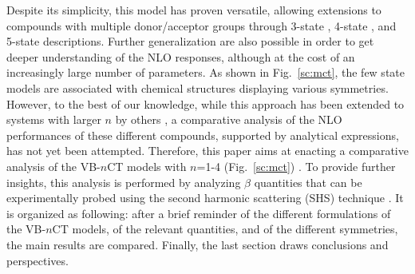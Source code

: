 \documentclass[USenglish]{article}
\begin{document}
Despite its simplicity, this model has proven versatile, allowing extensions to compounds with multiple donor/acceptor groups through 3-state \cite{hahnNonlinearOpticalProperties1999,barzoukasMolecularEngineeringPush2000,yangLargeOffDiagonalContribution2003}, 4-state \cite{choElementaryDescriptionNonlinear1998}, and 5-state \cite{choNonlinearOpticalProperties2002} descriptions. 
Further generalization are also possible \cite{alamGeneralizedFewstateModel2020} in order to get deeper understanding of the NLO responses, although at the cost of an increasingly large number of parameters.
As shown in Fig.~\ref{sc:mct}, the few state models are associated with chemical structures displaying various symmetries.
However, to the best of our knowledge, while this approach has been extended to systems with larger $n$ by others \cite{duboissetSecondHarmonicScatteringDefinedTopological2019}, a comparative analysis of the NLO performances of these different compounds, supported by analytical expressions, has not yet been attempted. Therefore, this paper aims at enacting a comparative analysis of the  VB-$n$CT models with $n$=1-4  (Fig.~\ref{sc:mct}) .  To provide further insights, this analysis is performed  by analyzing $\beta$ quantities that can be experimentally probed using the second harmonic scattering (SHS) technique \cite{verbiestSecondOrderNonlinearOptical2009,baumeierDensityfunctionalBasedDetermination2010,zhangTheoreticalInvestigationFirst2013,sistoInitioNonadiabaticDynamics2014,dellaiDynamicEffectsNonlinear2024}.
It is organized as following: after a brief reminder of the different formulations of the VB-$n$CT models, of the relevant quantities, and of the different symmetries, the main results are compared. Finally, the last section draws conclusions and perspectives.
\end{document}

